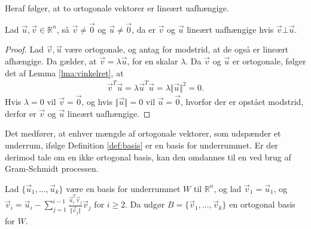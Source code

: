 Heraf følger, at to ortogonale vektorer er lineært uafhængige.
\begin{lma}
Lad $\vec{u}, \vec{v} \in \mathds{R}^n$, så $\vec{v} \neq \vec{0}$ og $\vec{u} \neq \vec{0}$, da er $\vec{v}$ og $\vec{u}$ lineært uafhængige hvis $\vec{v} \bot \vec{u}$.
\label{lma:ortolinuaf}
\end{lma}
\begin{proof}
Lad $\vec{v}, \vec{u}$ være ortogonale, og antag for modstrid, at de også er lineært afhængige.
Da gælder, at $\vec{v} = \lambda \vec{u}$, for en skalar $\lambda$.
Da $\vec{v}$ og $\vec{u}$ er ortogonale, følger det af Lemma \ref{lma:vinkelret}, at 
\begin{align*}
\vec{v}^T\vec{u} = \lambda\vec{u}^T\vec{u} = \lambda \Vert \vec{u} \Vert^2 = 0.
\end{align*}
Hvis $\lambda = 0$ vil $\vec{v}= \vec{0}$, og hvis $\Vert \vec{u} \Vert = 0$ vil $\vec{u} = \vec{0}$, hvorfor der er opstået modstrid, derfor er $\vec{v}$ og $\vec{u}$ lineært uafhængige.
\end{proof}
Det medfører, at enhver mængde af ortogonale vektorer, som udspænder et underrum, ifølge Definition \ref{def:basis} er
en basis for underrummet.
Er der derimod tale om en ikke ortogonal basis, kan den omdannes til en ved brug af Gram-Schmidt processen.
\begin{stn}
Lad $\{\vec{u}_1, ..., \vec{u}_k\}$ være en basis for underrummet $W$ til $\mathds{R}^n$, og lad 
$\vec{v}_1 = \vec{u}_1$, og $\vec{v}_i= \vec{u}_i - \sum_{j=1}^{i-1} \frac{\vec{u}_i^T \vec{v}_j}{\Vert\vec{v}_j\Vert}\vec{v}_j$ for $i \geq 2$.
Da udgør $B = \{\vec{v}_1,..., \vec{v}_k\}$ en ortogonal basis for $W$.
\label{stn:gram}
\end{stn}
